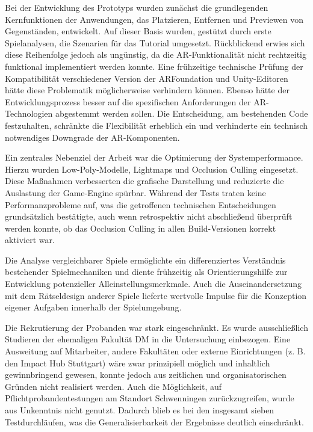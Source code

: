 Bei der Entwicklung des Prototyps wurden zunächst die grundlegenden Kernfunktionen der Anwendungen, das Platzieren, Entfernen und Previewen von Gegenständen, entwickelt. Auf dieser Basis wurden, gestützt durch erste Spielanalysen, die Szenarien für das Tutorial umgesetzt. Rückblickend erwies sich diese Reihenfolge jedoch als ungünstig, da die \ac{AR}-Funktionalität nicht rechtzeitig funktional implementiert werden konnte. Eine frühzeitige technische Prüfung der Kompatibilität verschiedener Version der ARFoundation und Unity-Editoren hätte diese Problematik möglicherweise verhindern können. Ebenso hätte der Entwicklungsprozess besser auf die spezifischen Anforderungen der \ac{AR}-Technologien abgestemmt werden sollen. Die Entscheidung, am bestehenden Code festzuhalten, schränkte die Flexibilität erheblich ein und verhinderte ein technisch notwendiges Downgrade der \ac{AR}-Komponenten. 

Ein zentrales Nebenziel der Arbeit war die Optimierung der Systemperformance. Hierzu wurden Low-Poly-Modelle, Lightmaps und Occlusion Culling eingesetzt. Diese Maßnahmen verbesserten die grafische Darstellung und reduzierte die Auslastung der Game-Engine spürbar. Während der Tests traten keine Performanzprobleme auf, was die getroffenen technischen Entscheidungen grundsätzlich bestätigte, auch wenn retrospektiv nicht abschließend überprüft werden konnte, ob das Occlusion Culling in allen Build-Versionen korrekt aktiviert war.

Die Analyse vergleichbarer Spiele ermöglichte ein differenziertes Verständnis bestehender Spielmechaniken und diente frühzeitig als Orientierungshilfe zur Entwicklung potenzieller Alleinstellungsmerkmale. Auch die Auseinandersetzung mit dem Rätseldesign anderer Spiele lieferte wertvolle Impulse für die Konzeption eigener Aufgaben innerhalb der Spielumgebung.

Die Rekrutierung der Probanden war stark eingeschränkt. Es wurde ausschließlich Studieren der ehemaligen Fakultät \ac{DM} in die Untersuchung einbezogen. Eine Ausweitung auf Mitarbeiter, andere Fakultäten oder externe Einrichtungen (z. B. den Impact Hub Stuttgart) wäre zwar prinzipiell möglich und inhaltlich gewinnbringend gewesen, konnte jedoch aus zeitlichen und organisatorischen Gründen nicht realisiert werden. Auch die Möglichkeit, auf Pflichtprobandentestungen am Standort Schwenningen zurückzugreifen, wurde aus Unkenntnis nicht genutzt. Dadurch blieb es bei den insgesamt sieben Testdurchläufen, was die Generalisierbarkeit der Ergebnisse deutlich einschränkt.

